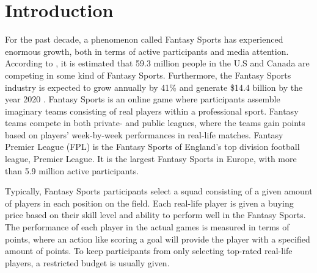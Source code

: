 
\pagestyle{fancy}
\fancyhf{}
\renewcommand{\chaptermark}[1]{\markboth{\chaptername\ \thechapter.\ #1}{}}
\renewcommand{\sectionmark}[1]{\markright{\thesection\ #1}}
\renewcommand{\headrulewidth}{0.1ex}
\renewcommand{\footrulewidth}{0.1ex}
\fancyfoot[LE,RO]{\thepage}
\fancyhead[LE]{\leftmark}
\fancyhead[RO]{\rightmark}
\fancypagestyle{plain}{\fancyhf{}\fancyfoot[LE,RO]{\thepage}\renewcommand{\headrulewidth}{0ex}}

\setcounter{page}{1}

\chapter{Introduction}\label{introduction}


For the past decade, a phenomenon called Fantasy Sports has experienced enormous growth, both in terms of active participants and media attention. According to \cite{fantasysports_users}, it is estimated that 59.3 million people in the U.S and Canada are competing in some kind of Fantasy Sports. Furthermore, the Fantasy Sports industry is expected to grow annually by 41\% and generate \$14.4 billion by the year 2020 \citep{forbes}. Fantasy Sports is an online game where participants assemble imaginary teams consisting of real players within a professional sport. Fantasy teams compete in both private- and public leagues, where the teams gain points based on players' week-by-week performances in real-life matches. Fantasy Premier League (FPL) is the Fantasy Sports of England's top division football league, Premier League. It is the largest Fantasy Sports in Europe, with more than 5.9 million active participants.

\newpar


Typically, Fantasy Sports participants select a squad consisting of a given amount of players in each position on the field. Each real-life player is given a buying price based on their skill level and ability to perform well in the Fantasy Sports. The performance of each player in the actual games is measured in terms of points, where an action like scoring a goal will provide the player with a specified amount of points. To keep participants from only selecting top-rated real-life players, a restricted budget is usually given.

\newpar


